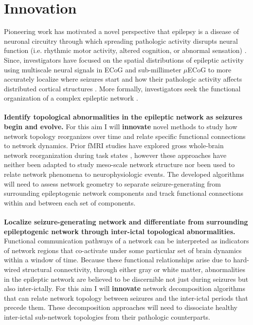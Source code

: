 \section{Innovation}
Pioneering work has motivated a novel perspective that epilepsy is a disease of neuronal circuitry through which spreading pathologic activity disrupts neural function (i.e. rhythmic motor activity, altered cognition, or abnormal sensation) \cite{kutsy1999ictal, spencer2002neural}. Since, investigators have focused on the spatial distributions of epileptic activity using multiscale neural signals in ECoG and sub-millimeter $\mu$ECoG to more accurately localize where seizures start and how their pathologic activity affects distributed cortical structures \cite{worrell2008high-frequency, schevon2009spatial, stead2010microseizures, viventi2011flexible, feldt_muldoon2013spatially, weiss2013ictal}. More formally, investigators seek the functional organization of a complex epileptic network \cite{spencer2002neural, kramer2012epilepsy, lehnertz2014evolving}.
~\\
~\\
 \textbf{Identify topological abnormalities in the epileptic network as seizures begin and evolve.}
For this aim I will \textbf{innovate} novel methods to study how network topology reorganizes over time and relate specific functional connections to network dynamics. Prior fMRI studies have explored gross whole-brain network reorganization during task states \cite{bassett2006adaptive, bassett2011dynamic}, however these approaches have neither been adapted to study meso-scale network structure nor been used to relate network phenomena to neurophysiologic events. The developed algorithms will need to assess network geometry to separate seizure-generating from surrounding epileptogenic network components and track functional connections \cite{holme2012temporal} within and between each set of components.
~\\
~\\
 \textbf{Localize seizure-generating network and differentiate from surrounding epileptogenic network through inter-ictal topological abnormalities.}
Functional communication pathways of a network can be interpreted as indicators of network regions that co-activate under some particular set of brain dynamics within a window of time. Because these functional relationships arise due to hard-wired structural connectivity, through either gray or white matter, abnormalities in the epileptic network are believed to be discernible not just during seizures but also inter-ictally. For this aim I will \textbf{innovate} network decomposition algorithms that can relate network topology between seizures and the inter-ictal periods that precede them. These decomposition approaches will need to dissociate healthy inter-ictal sub-network topologies from their pathologic counterparts.
